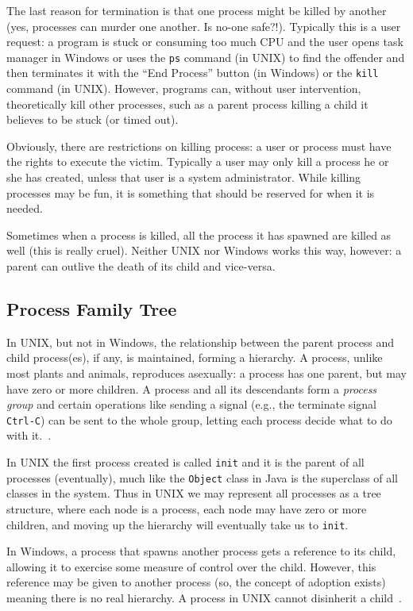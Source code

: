 The last reason for termination is that one process might be killed by another (yes, processes can murder one another. Is no-one safe?!). Typically this is a user request: a program is stuck or consuming too much CPU and the user opens task manager in Windows or uses the \texttt{ps} command (in UNIX) to find the offender and then terminates it with the ``End Process'' button (in Windows) or the \texttt{kill} command (in UNIX). However, programs can, without user intervention, theoretically kill other processes, such as a parent process killing a child it believes to be stuck (or timed out).

Obviously, there are restrictions on killing process: a user or process must have the rights to execute the victim. Typically a user may only kill a process he or she has created, unless that user is a system administrator. While killing processes may be fun, it is something that should be reserved for when it is needed.

Sometimes when a process is killed, all the process it has spawned are killed as well (this is really cruel). Neither UNIX nor Windows works this way, however: a parent can outlive the death of its child and vice-versa.

\subsection*{Process Family Tree}
In UNIX, but not in Windows, the relationship between the parent process and child process(es), if any, is maintained, forming a hierarchy. A process, unlike most plants and animals, reproduces asexually: a process has one parent, but may have zero or more children. A process and all its descendants form a \textit{process group} and certain operations like sending a signal (e.g., the terminate signal \texttt{Ctrl-C}) can be sent to the whole group, letting each process decide what to do with it.~\cite{mos}.

In UNIX the first process created is called \texttt{init} and it is the parent of all processes (eventually), much like the \texttt{Object} class in Java is the superclass of all classes in the system. Thus in UNIX we may represent all processes as a tree structure, where each node is a process, each node may have zero or more children, and moving up the hierarchy will eventually take us to \texttt{init}.

In Windows, a process that spawns another process gets a reference to its child, allowing it to exercise some measure of control over the child. However, this reference may be given to another process (so, the concept of adoption exists) meaning there is no real hierarchy. A process in UNIX cannot disinherit a child~\cite{mos}.


